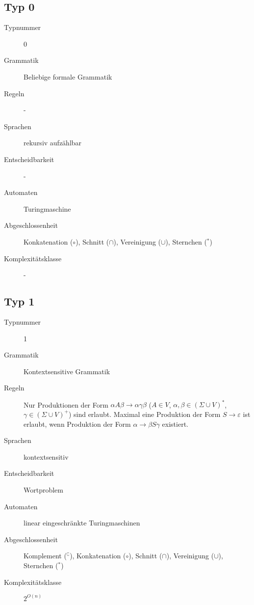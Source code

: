     \subsection{Typ 0}
        \begin{description}
            \item[Typnummer] 0
            \item[Grammatik] Beliebige formale Grammatik
            \item[Regeln] -
            \item[Sprachen] rekursiv aufzählbar
            \item[Entscheidbarkeit] -
            \item[Automaten] Turingmaschine
            \item[Abgeschlossenheit] Konkatenation ($ \circ $), Schnitt ($ \cap $), Vereinigung ($ \cup $), Sternchen ($ ^ * $)
            \item[Komplexitätsklasse] -
        \end{description}

    \subsection{Typ 1}
        \begin{description}
            \item[Typnummer] 1
            \item[Grammatik] Kontextsensitive Grammatik
            \item[Regeln] Nur Produktionen der Form $ \alpha A \beta \rightarrow \alpha \gamma \beta $ ($ A \in V $, $ \alpha, \beta \in (\Sigma \cup V) ^ * $, $ \gamma \in (\Sigma \cup V) ^ + $) sind erlaubt. Maximal eine Produktion der Form $ S \rightarrow \varepsilon $ ist erlaubt, wenn Produktion der Form $ \alpha \rightarrow \beta S \gamma $ existiert.
            \item[Sprachen] kontextsensitiv
            \item[Entscheidbarkeit] Wortproblem
            \item[Automaten] linear eingeschränkte Turingmaschinen
            \item[Abgeschlossenheit] Komplement ($ ^ \complement $), Konkatenation ($ \circ $), Schnitt ($ \cap $), Vereinigung ($ \cup $), Sternchen ($ ^ * $)
            \item[Komplexitätsklasse] $ 2 ^ { O(n) } $
        \end{description}

